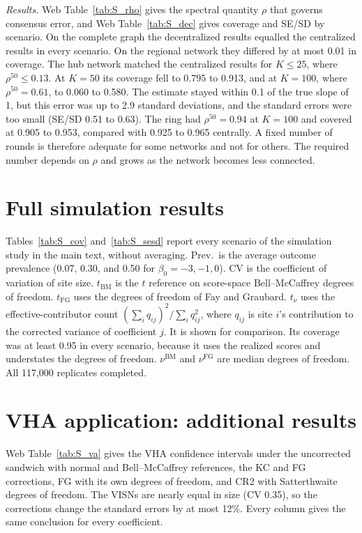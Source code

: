 \documentclass[12pt]{article}
\theoremstyle{remark}
\numberwithin{equation}{section}
\begin{document}
\emph{Results.} Web Table~\ref{tab:S_rho} gives the spectral quantity $\rho$ that
governs consensus error, and Web Table~\ref{tab:S_dec} gives coverage and SE/SD
by scenario. On the complete graph the decentralized results equalled the
centralized results in every scenario. On the regional network they differed by at
most 0.01 in coverage. The hub network matched the centralized results for
$K\le25$, where $\rho^{50}\le0.13$. At $K=50$ its coverage fell to 0.795 to 0.913,
and at $K=100$, where $\rho^{50}=0.61$, to 0.060 to 0.580. The estimate stayed
within 0.1 of the true slope of 1, but this error was up to 2.9 standard
deviations, and the standard errors were too small (SE/SD 0.51 to 0.63). The ring
had $\rho^{50}=0.94$ at $K=100$ and covered at 0.905 to 0.953, compared with
0.925 to 0.965 centrally. A fixed number of rounds is therefore adequate for some
networks and not for others. The required number depends on $\rho$ and grows as
the network becomes less connected.



\section{Full simulation results}
\label{app:J}
\label{sec:supp_sim}

Tables~\ref{tab:S_cov} and~\ref{tab:S_sesd} report every scenario of the
simulation study in the main text, without averaging. Prev.\ is the average
outcome prevalence (0.07, 0.30, and 0.50 for $\beta_0=-3,-1,0$). CV is the
coefficient of variation of site size. $t_{\mathrm{BM}}$ is the $t$ reference on
score-space Bell--McCaffrey degrees of freedom. $t_{\mathrm{FG}}$ uses the degrees
of freedom of Fay and Graubard. $t_\nu$ uses the effective-contributor count
$(\sum_iq_{ij})^2/\sum_iq_{ij}^2$, where $q_{ij}$ is site $i$'s contribution
to the corrected variance of coefficient $j$. It is shown for comparison. Its
coverage was at least 0.95 in every scenario, because it uses the realized scores
and understates the degrees of freedom. $\nu^{\mathrm{BM}}$ and $\nu^{\mathrm{FG}}$ are
median degrees of freedom. All 117{,}000 replicates completed.

{\footnotesize\setlength{\tabcolsep}{3pt}

}


\section{VHA application: additional results}
\label{app:K}
\label{sec:supp_va}

Web Table~\ref{tab:S_va} gives the VHA confidence intervals under the uncorrected
sandwich with normal and Bell--McCaffrey references, the KC and FG corrections,
FG with its own degrees of freedom, and CR2 with Satterthwaite degrees of freedom.
The VISNs are nearly equal in size (CV 0.35), so the corrections change the
standard errors by at most 12\%. Every column gives the same conclusion for every
coefficient.






\end{document}
